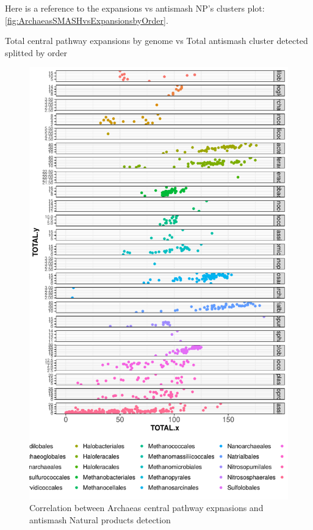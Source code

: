 \documentclass[12pt,twoside]{reedthesis}
\begin{document}
  Here is a reference to the expansions vs antismash NP's clusters plot:
  \autoref{fig:ArchaeasSMASHvsExpansionsbyOrder}. \clearpage 
  
  Total central pathway expansions by genome vs Total antismash cluster
  detected splitted by order
  
  \begin{figure}[h!tbp]
  \centering
  \includegraphics[angle = 0,scale = 0.5]{chapter2/Archaeas/ArchaeasSMASHvsExpansionsbyOrderGRID.pdf}
  \caption[Correlation between Archaeas central pathway expnasions and antismash Natural products detection]{\normalsize{Correlation between Archaeas central pathway expnasions and antismash Natural products detection}}
  \label{fig:ArchaeasSMASHvsExpansionsbyOrderGRID}
  \end{figure}
  
\end{document}
